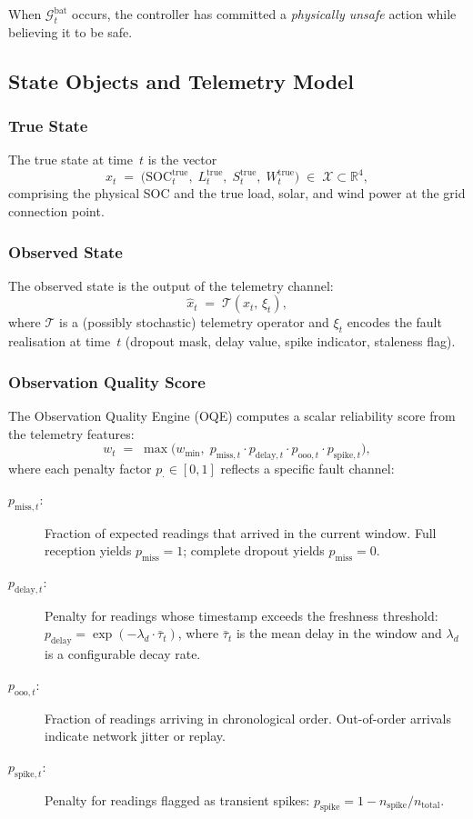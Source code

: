 When $\mathcal{G}_t^{\mathrm{bat}}$ occurs, the controller has committed
a \emph{physically unsafe} action while believing it to be safe.

\subsection{State Objects and Telemetry Model}

\subsubsection{True State}

The true state at time~$t$ is the vector
\[
  x_t \;=\; \bigl(\mathrm{SOC}_t^{\mathrm{true}},\;
  L_t^{\mathrm{true}},\; S_t^{\mathrm{true}},\; W_t^{\mathrm{true}}\bigr)
  \;\in\; \mathcal{X} \subset \mathbb{R}^4,
\]
comprising the physical SOC and the true load, solar, and wind power at
the grid connection point.

\subsubsection{Observed State}

The observed state is the output of the telemetry channel:
\[
  \hat{x}_t \;=\; \mathcal{T}(x_t,\, \xi_t),
\]
where $\mathcal{T}$ is a (possibly stochastic) telemetry operator and
$\xi_t$ encodes the fault realisation at time~$t$ (dropout mask, delay
value, spike indicator, staleness flag).

\subsubsection{Observation Quality Score}
\label{sec:oqe-formula}

The Observation Quality Engine (OQE) computes a scalar reliability
score from the telemetry features:
\[
  w_t \;=\; \max\!\bigl(w_{\min},\;
    p_{\mathrm{miss},t} \cdot p_{\mathrm{delay},t}
    \cdot p_{\mathrm{ooo},t} \cdot p_{\mathrm{spike},t}\bigr),
\]
where each penalty factor $p_{\cdot} \in [0, 1]$ reflects a specific
fault channel:

\begin{description}
  \item[$p_{\mathrm{miss},t}$:] Fraction of expected readings that
    arrived in the current window.  Full reception yields $p_{\mathrm{miss}} = 1$;
    complete dropout yields $p_{\mathrm{miss}} = 0$.
  \item[$p_{\mathrm{delay},t}$:] Penalty for readings whose timestamp
    exceeds the freshness threshold: $p_{\mathrm{delay}} =
    \exp(-\lambda_d \cdot \bar{\tau}_t)$, where $\bar{\tau}_t$ is the
    mean delay in the window and $\lambda_d$ is a configurable decay rate.
  \item[$p_{\mathrm{ooo},t}$:] Fraction of readings arriving in
    chronological order.  Out-of-order arrivals indicate network jitter
    or replay.
  \item[$p_{\mathrm{spike},t}$:] Penalty for readings flagged as
    transient spikes: $p_{\mathrm{spike}} = 1 - n_{\mathrm{spike}} /
    n_{\mathrm{total}}$.
\end{description}

